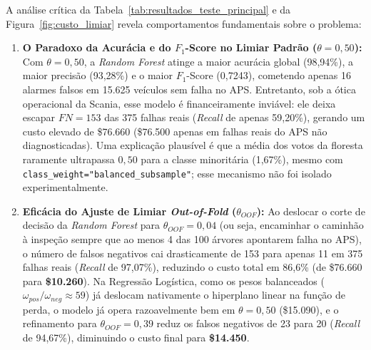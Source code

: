 \documentclass[conference]{IEEEtran}
\begin{document}
A análise crítica da Tabela~\ref{tab:resultados_teste_principal} e da Figura~\ref{fig:custo_limiar} revela comportamentos fundamentais sobre o problema:
\begin{enumerate}
    \item \textbf{O Paradoxo da Acurácia e do $F_1$-Score no Limiar Padrão ($\theta = 0{,}50$):} Com $\theta = 0{,}50$, a \textit{Random Forest} atinge a maior acurácia global (98,94\%), a maior precisão (93,28\%) e o maior $F_1$-Score (0,7243), cometendo apenas 16 alarmes falsos em 15.625 veículos sem falha no APS. Entretanto, sob a ótica operacional da Scania, esse modelo é financeiramente inviável: ele deixa escapar $FN = 153$ das 375 falhas reais (\textit{Recall} de apenas 59,20\%), gerando um custo elevado de \$76.660 (\$76.500 apenas em falhas reais do APS não diagnosticadas). Uma explicação plausível é que a média dos votos da floresta raramente ultrapassa $0{,}50$ para a classe minoritária (1,67\%), mesmo com \texttt{class\_weight="balanced\_subsample"}; esse mecanismo não foi isolado experimentalmente.
    \item \textbf{Eficácia do Ajuste de Limiar \textit{Out-of-Fold} ($\theta_{OOF}$):} Ao deslocar o corte de decisão da \textit{Random Forest} para $\theta_{OOF} = 0{,}04$ (ou seja, encaminhar o caminhão à inspeção sempre que ao menos 4 das 100 árvores apontarem falha no APS), o número de falsos negativos cai drasticamente de 153 para apenas 11 em 375 falhas reais (\textit{Recall} de 97,07\%), reduzindo o custo total em 86,6\% (de \$76.660 para \textbf{\$10.260}). Na Regressão Logística, como os pesos balanceados ($\omega_{pos}/\omega_{neg} \approx 59$) já deslocam nativamente o hiperplano linear na função de perda, o modelo já opera razoavelmente bem em $\theta = 0{,}50$ (\$15.090), e o refinamento para $\theta_{OOF} = 0{,}39$ reduz os falsos negativos de 23 para 20 (\textit{Recall} de 94,67\%), diminuindo o custo final para \textbf{\$14.450}.

\end{enumerate}
\end{document}
